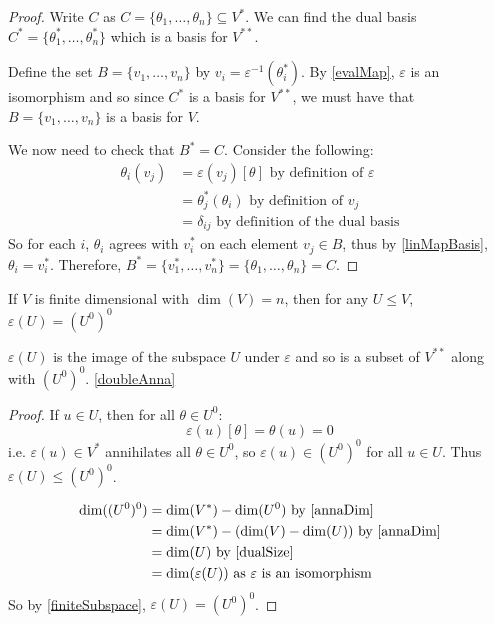 \documentclass[../main.tex]{subfiles}
\begin{document}
\begin{proof}
  Write $C$ as $C = \{\theta_1, \ldots, \theta_n\} \subseteq V^{*}$.
  We can find the dual basis $C^{*} = \{\theta^{*}_1, \ldots, \theta^{*}_n\}$ which is a basis for $V^{**}$.

  Define the set $B = \{v_1, \ldots, v_n\}$ by $v_i = \varepsilon^{-1}(\theta^{*}_i)$.
  By \cref{evalMap}, $\varepsilon$ is an isomorphism and so since $C^{*}$ is a basis for $V^{**}$, we must have that $B = \{v_1, \ldots, v_n\}$ is a basis for $V$.

  We now need to check that $B^{*} = C$.
  Consider the following:
  \begin{align*}
    \theta_i(v_j) &= \varepsilon(v_j)[\theta] \text{ by definition of $\varepsilon$} \\
                  &= \theta^{*}_j(\theta_i) \text{ by definition of $v_j$} \\
                  &= \delta_{i j} \text{ by definition of the dual basis}
  \end{align*}
  So for each $i$, $\theta_i$ agrees with $v^{*}_i$ on each element $v_j \in B$, thus by \cref{linMapBasis}, $\theta_i = v^{*}_i$.
  Therefore, $B^{*} = \{v^{*}_1, \ldots, v^{*}_n\} = \{\theta_1, \ldots, \theta_n\} = C$.
\end{proof}
\begin{proposition}
  If $V$ is finite dimensional with $\dim(V) = n$, then for any $U \leq V$, $\varepsilon(U) = (U^{0})^{0}$
\end{proposition}
\begin{remark}
  $\varepsilon(U)$ is the image of the subspace $U$ under $\varepsilon$ and so is a subset of $V^{**}$ along with $(U^{0})^{0}$. \cref{doubleAnna}
\end{remark}
\begin{proof}
  If $u \in U$, then for all $\theta \in U^{0}$:
  \[
    \varepsilon(u)[\theta] = \theta(u) = 0
  \]
  i.e. $\varepsilon(u) \in V^{*}$ annihilates all $\theta \in U^{0}$, so $\varepsilon(u) \in (U^{0})^{0}$ for all $u \in U$.
  Thus $\varepsilon(U) \leq (U^{0})^{0}$.

  \begin{align*}
    \dim((U^{0})^{0}) &= \dim(V^{*}) - \dim(U^{0}) \text{ by \cref{annaDim}} \\
                      &= \dim(V^{*}) - (\dim(V) - \dim(U)) \text{ by \cref{annaDim}} \\
                      &= \dim(U) \text{ by \cref{dualSize}} \\
                      &= \dim(\varepsilon(U)) \text{ as $\varepsilon$ is an isomorphism}
  \end{align*}
  So by \cref{finiteSubspace}, $\varepsilon(U) = (U^{0})^{0}$.
\end{proof}
\end{document}
